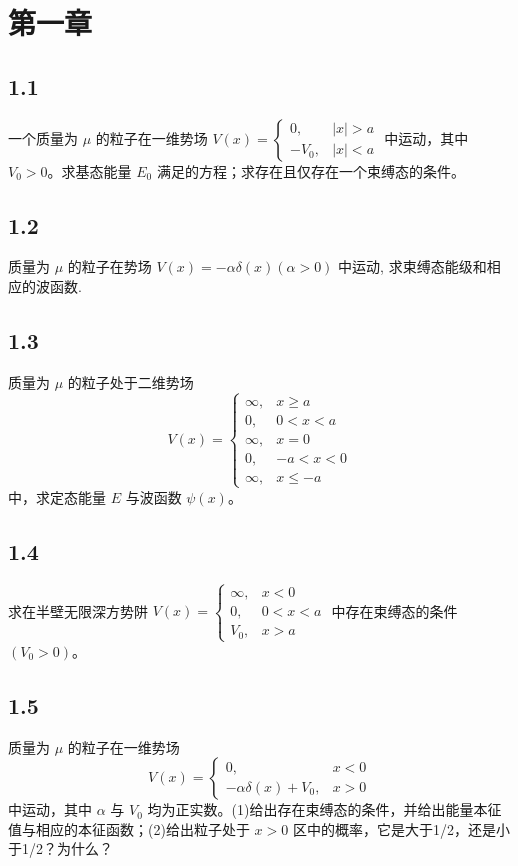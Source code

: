\section{第一章}

\subsection{1.1}
一个质量为 $\mu$ 的粒子在一维势场 $V(x) = \begin{cases} 0, & |x| > a \\ -V_0, & |x| < a \end{cases}$ 中运动，其中 $V_0 > 0$。求基态能量 $E_0$ 满足的方程；求存在且仅存在一个束缚态的条件。

\subsection{1.2}
质量为 $\mu$ 的粒子在势场 $V(x) = - \alpha \delta (x) (\alpha > 0)$ 中运动, 求束缚态能级和相应的波函数.

\subsection{1.3}
质量为 $\mu$ 的粒子处于二维势场
$$V(x)=\begin{cases}
\infty, & x\geqslant a \\
0, & 0<x<a \\
\infty, & x=0 \\
0, & -a<x<0 \\
\infty, & x\leqslant-a
\end{cases}$$
中，求定态能量 $E$ 与波函数 $\psi(x)$。

\subsection{1.4}
求在半壁无限深方势阱 $V(x) = \begin{cases} \infty, & x < 0 \\ 0, & 0 < x < a \\ V_0, & x > a \end{cases}$ 中存在束缚态的条件 $(V_0 > 0)$。

\subsection{1.5}
质量为 $\mu$ 的粒子在一维势场 
$$V(x) = \begin{cases} 
0, & x<0 \\ 
-\alpha \delta (x) + V_0, & x>0 
\end{cases}$$
中运动，其中 $\alpha$ 与 $V_0$ 均为正实数。(1)给出存在束缚态的条件，并给出能量本征值与相应的本征函数；(2)给出粒子处于 $x > 0$ 区中的概率，它是大于1/2，还是小于1/2？为什么？

